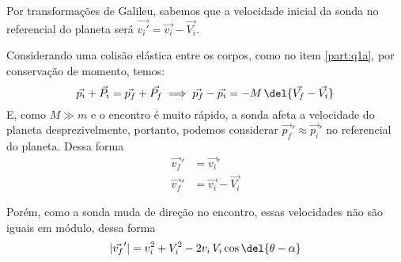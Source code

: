 \documentclass[]{IMTexam}
\begin{document}
\begin{questions}
\begin{parts}
\begin{solution}
			Por transformações de Galileu, sabemos que a velocidade inicial da sonda no referencial do planeta será $ \vec{v_i'}=\vec{v_i}-\vec{V_i} $.
			
			Considerando uma colisão elástica entre os corpos, como no item \ref{part:q1a}, por conservação de momento, temos:
			\[ \vec{p_i}+\vec{P_i}=\vec{p_f}+\vec{P_f}\implies \vec{p_f}-\vec{p_i}=-M\,\del{\vec{V_f}-\vec{V_i}} \]
			E, como $ M\gg m $ e o encontro é muito rápido, a sonda afeta a velocidade do planeta desprezivelmente, portanto, podemos considerar $ \vec{p_f}'\approx \vec{p_i}' $ no referencial do planeta. Dessa forma
			\begin{align*}
				\vec{v_f}'&=\vec{v_i}'\\
				\vec{v_f}'&=\vec{v_i}-\vec{V_i}
			\end{align*}
			
			\begin{multi}
				Porém, como a sonda muda de direção no encontro, essas velocidades não são iguais em módulo, dessa forma
				\begin{equation}\label{eq:vfNH}
				|\vec{v_f}'|=v_i^{2}+V_i^{2}-2v_i\,V_i\cos \del{\theta-\alpha}
				\end{equation}
				
				\nach
				\centering
			\end{multi}
			
			
			
%			
			

\end{solution}
\end{parts}
\end{questions}
\end{document}
